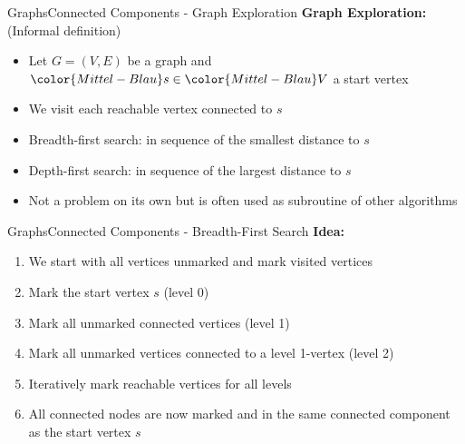 
\begin{frame}{Graphs}{Connected Components - Graph Exploration}
  \textbf{Graph Exploration:} (Informal definition)
  \begin{itemize}
    \item<2->
      Let {\color{Mittel-Blau}$G = (V , E)$} be a graph and
      ${\color{Mittel-Blau}s} \in {\color{Mittel-Blau}V}$ a start vertex
    \item<3->
      We visit each reachable vertex connected to {\color{Mittel-Blau}$s$}
    \item<4->
      {\color{Mittel-Blau}Breadth-first search}: in sequence of the
      smallest distance to {\color{Mittel-Blau}$s$}
    \item<5->
      {\color{Mittel-Blau}Depth-first search}: in sequence of the
      largest distance to {\color{Mittel-Blau}$s$}
    \item<6->
      Not a problem on its own but is often used as subroutine of other algorithms
  \end{itemize}
\end{frame}


\begin{frame}{Graphs}{Connected Components - Breadth-First Search}
  \textbf{Idea:}
  \begin{enumerate}
    \item<2->
      We start with all vertices unmarked and
      {\color{Mittel-Blau}mark visited vertices}
    \item<3->
      Mark the start vertex {\color{Mittel-Blau}$s$}
      ({\color{Mittel-Blau}level 0})
    \item<4->
      Mark all unmarked {\color{Mittel-Blau}connected vertices}
      ({\color{Mittel-Blau}level 1})
    \item<5->
      Mark all unmarked {\color{Mittel-Blau}vertices connected} to a
      {\color{Mittel-Blau}level 1}-vertex
      ({\color{Mittel-Blau}level 2})
    \item<6->
      Iteratively mark reachable vertices for all levels
    \item<7->
      All connected nodes are now marked and in the same
      {\color{Mittel-Blau}connected component} as the start vertex
      {\color{Mittel-Blau}$s$}
  \end{enumerate}
\end{frame}


